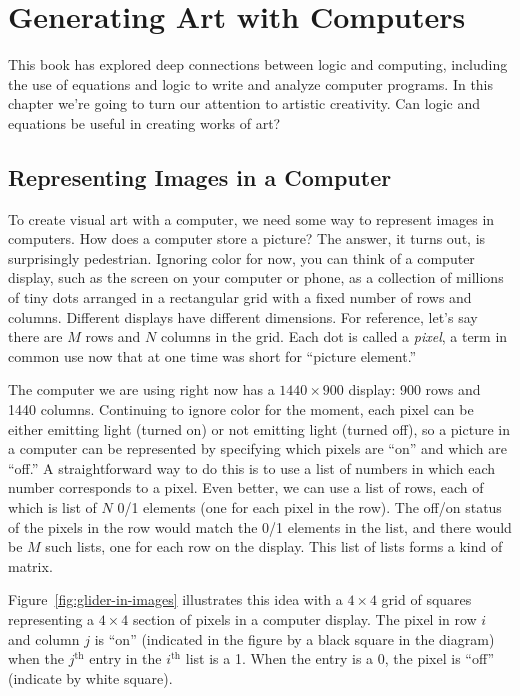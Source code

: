 \chapter{Generating Art with Computers}
\label{ch:art-computers}

This book has explored deep connections between logic
and computing, including the use of equations and logic to
write and analyze computer programs. In this chapter we're going
to turn our attention to artistic creativity. Can logic and
equations be useful in creating works of art?

\section{Representing Images in a Computer}

To create visual art with a computer, we need some way to
represent images in computers. How does a computer
store a picture?
The answer, it turns out, is surprisingly pedestrian. Ignoring
color for now, you can think of a computer display, such as the
screen on your computer or phone, as a collection of millions
of tiny dots arranged in a rectangular grid with a fixed number
of rows and columns. Different displays have different dimensions.
For reference, let's say there are $M$ rows and $N$ columns
in the grid.
Each dot is called a \emph{pixel}, a term in common use now
that at one time was short for ``picture element.''

The computer we are using right now has
a $1440\times900$ display: 900 rows and 1440 columns.
Continuing to ignore color for the moment, each pixel can
be either emitting light (turned on) or not emitting light 
(turned off), so a picture in a computer can be represented
by specifying which pixels are ``on'' and which
are ``off.'' A straightforward way to do this is to use a list of
numbers in which each number corresponds to a pixel. Even better,
we can use a list of rows, each of which is list of $N$
0/1 elements (one for each pixel in the row). 
The off/on status of the pixels in the row would
match the 0/1 elements in the list, 
and there would be $M$ such lists, one for each row on the display.
This list of lists forms a kind of matrix.

Figure~\ref{fig:glider-in-images} illustrates
this idea with a $4\times4$ grid of squares
representing a $4\times4$ section of pixels in a computer display.
The pixel in row $i$ and column $j$ is ``on'' 
(indicated in the figure by a black square in the diagram) 
when the $j^\text{th}$
entry in the $i^\text{th}$ list is a 1.
When the entry is a 0, the pixel is ``off'' (indicate by white square).

